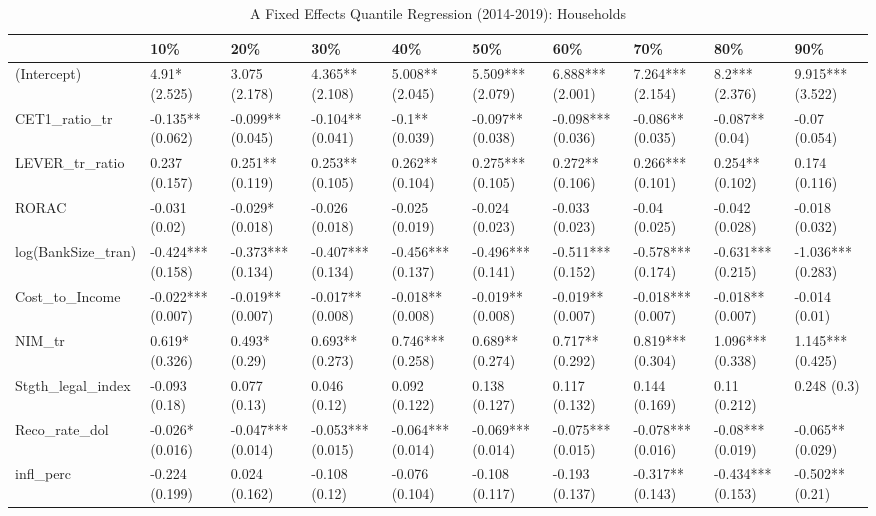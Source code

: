 \begin{table}[ht]
\centering
\caption{A Fixed Effects Quantile Regression (2014-2019): Households} 
\begingroup\small
\begin{tabular}{llllllllll}
  \toprule
 & 10\% & 20\% & 30\% & 40\% & 50\% & 60\% & 70\% & 80\% & 90\% \\ 
  \midrule
(Intercept) & 4.91* (2.525) & 3.075 (2.178) & 4.365** (2.108) & 5.008** (2.045) & 5.509*** (2.079) & 6.888*** (2.001) & 7.264*** (2.154) & 8.2*** (2.376) & 9.915*** (3.522) \\ 
  CET1\_ratio\_tr & -0.135** (0.062) & -0.099** (0.045) & -0.104** (0.041) & -0.1** (0.039) & -0.097** (0.038) & -0.098*** (0.036) & -0.086** (0.035) & -0.087** (0.04) & -0.07 (0.054) \\ 
  LEVER\_tr\_ratio & 0.237 (0.157) & 0.251** (0.119) & 0.253** (0.105) & 0.262** (0.104) & 0.275*** (0.105) & 0.272** (0.106) & 0.266*** (0.101) & 0.254** (0.102) & 0.174 (0.116) \\ 
  RORAC & -0.031 (0.02) & -0.029* (0.018) & -0.026 (0.018) & -0.025 (0.019) & -0.024 (0.023) & -0.033 (0.023) & -0.04 (0.025) & -0.042 (0.028) & -0.018 (0.032) \\ 
  log(BankSize\_tran) & -0.424*** (0.158) & -0.373*** (0.134) & -0.407*** (0.134) & -0.456*** (0.137) & -0.496*** (0.141) & -0.511*** (0.152) & -0.578*** (0.174) & -0.631*** (0.215) & -1.036*** (0.283) \\ 
  Cost\_to\_Income & -0.022*** (0.007) & -0.019** (0.007) & -0.017** (0.008) & -0.018** (0.008) & -0.019** (0.008) & -0.019** (0.007) & -0.018*** (0.007) & -0.018** (0.007) & -0.014 (0.01) \\ 
  NIM\_tr & 0.619* (0.326) & 0.493* (0.29) & 0.693** (0.273) & 0.746*** (0.258) & 0.689** (0.274) & 0.717** (0.292) & 0.819*** (0.304) & 1.096*** (0.338) & 1.145*** (0.425) \\ 
  Stgth\_legal\_index & -0.093 (0.18) & 0.077 (0.13) & 0.046 (0.12) & 0.092 (0.122) & 0.138 (0.127) & 0.117 (0.132) & 0.144 (0.169) & 0.11 (0.212) & 0.248 (0.3) \\ 
  Reco\_rate\_dol & -0.026* (0.016) & -0.047*** (0.014) & -0.053*** (0.015) & -0.064*** (0.014) & -0.069*** (0.014) & -0.075*** (0.015) & -0.078*** (0.016) & -0.08*** (0.019) & -0.065** (0.029) \\ 
  infl\_perc & -0.224 (0.199) & 0.024 (0.162) & -0.108 (0.12) & -0.076 (0.104) & -0.108 (0.117) & -0.193 (0.137) & -0.317** (0.143) & -0.434*** (0.153) & -0.502** (0.21) \\ 

\end{tabular}
\end{table}
